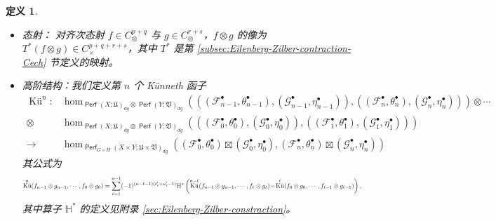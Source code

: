 \documentclass[11pt,a4paper]{article}
\DeclareMathOperator{\Perf}{\mathsf{Perf}}
\DeclareMathOperator{\Ku}{\textrm{Kü}}
\theoremstyle{cnth}
\newtheorem{defn}[thm]{定义}
\begin{document}
\begin{defn}
\begin{itemize}
\item
态射：
对齐次态射 $f\in C_{\otimes}^{p+q}$ 与 $g\in C_{\otimes}^{r+s}$，$f\otimes g$ 的像为 $T^{\ast}(f\otimes g)\in C_{\times}^{p+q+r+s}$，其中 $T^{\ast}$ 是第 \ref{subsec:Eilenberg-Zilber-contraction-Cech} 节定义的映射。
\item
高阶结构：我们定义第 $n$ 个 Künneth 函子
\begin{align*}
\Ku^n\colon &\hom_{\Perf (X;\mathfrak{U})_{dg}\otimes\Perf(Y;\mathfrak{V})_{dg}}\left(\left(
    (\mathcal{F}_{n-1}^{\bullet},\theta_{n-1}^{\bullet}),(\mathcal{G}_{n-1}^{\bullet},\eta_{n-1}^{\bullet})\right),
    \left((\mathcal{F}_n^{\bullet},\theta_n^{\bullet}),(\mathcal{G}_{n}^{\bullet},\eta_n^{\bullet})\right)\right)
    \otimes\dotsb\\ 
    \otimes
    &\hom_{\Perf (X;\mathfrak{U})_{dg}\otimes\Perf(Y;\mathfrak{V})_{dg}}\left(\left(
    (\mathcal{F}_0^{\bullet},\theta_0^{\bullet}),(\mathcal{G}_0^{\bullet},\eta_0^{\bullet})\right),
    \left((\mathcal{F}_1^{\bullet},\theta_1^{\bullet}),(\mathcal{G}_1^{\bullet},\eta_1^{\bullet})\right)\right)\\
    \to &\hom_{\Perf_{G\times H} (X\times Y;\mathfrak{U}\times\mathfrak{V})_{dg}}
    \left((\mathcal{F}_0^{\bullet},\theta_0^{\bullet})\boxtimes (\mathcal{G}_0^{\bullet},\eta_0^{\bullet}),(\mathcal{F}_n^{\bullet},\theta_n^{\bullet})\boxtimes (\mathcal{G}_n^{\bullet},\eta_n^{\bullet})\right)
\end{align*}
其公式为
\[
\resizebox{\linewidth}{!}{$\displaystyle
    \Ku^n (f_{n-1}\otimes g_{n-1},\dotsb, f_0\otimes g_0)=\sum_{\ell=1}^{n-1} (-1)^{(n-\ell -1)(t_{\ell}'+u_{\ell}'-1)}\mathbb{H}^{\ast}\left(
        \Ku^{n-\ell} (f_{n-1}\otimes g_{n-1},\dotsb, f_{\ell}\otimes g_{\ell})\circ\Ku^{\ell} (f_0\otimes g_0,\dotsb, f_{\ell-1}\otimes g_{\ell-1})
        \right),$}
\]
其中算子 $\mathbb{H}^{\ast}$ 的定义见附录 \ref{sec:Eilenberg-Zilber-constraction}。
\end{itemize}
\end{defn}
\end{document}
